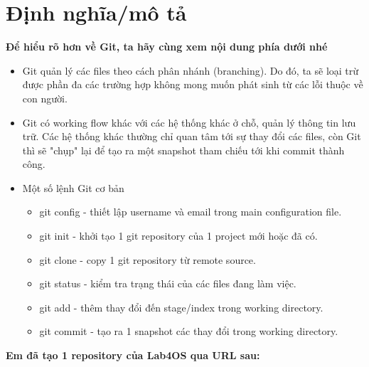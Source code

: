 \documentclass[a4paper]{article}
\begin{document}
	\section{Định nghĩa/mô tả}
	\textbf{Để hiểu rõ hơn về Git, ta hãy cùng xem nội dung phía dưới nhé}
	\\
	\begin{itemize}
		\item Git quản lý các files theo cách phân nhánh (branching). Do đó, ta sẽ loại trừ được phần đa các trường hợp không mong muốn phát sinh từ các lỗi thuộc về con người.
		\item Git có working flow khác với các hệ thống khác ở chỗ, quản lý thông tin lưu trữ. Các hệ thống khác thường chỉ quan tâm tới sự thay đổi các files, còn Git thì sẽ "chụp" lại để tạo ra một snapshot tham chiếu tới khi commit thành công.
		\item Một số lệnh Git cơ bản
		\begin{itemize}
			\item git config - thiết lập username và email trong main configuration file.
			\item git init - khởi tạo 1 git repository của 1 project mới hoặc đã có.
			\item git clone - copy 1 git repository từ remote source.
			\item git status - kiểm tra trạng thái của các files đang làm việc.
			\item git add - thêm thay đổi đến stage/index trong working directory.
			\item git commit - tạo ra 1 snapshot các thay đổi trong working directory.
		\end{itemize}
	\end{itemize}
	\textbf{Em đã tạo 1 repository của Lab4OS qua URL sau:}
\end{document}
